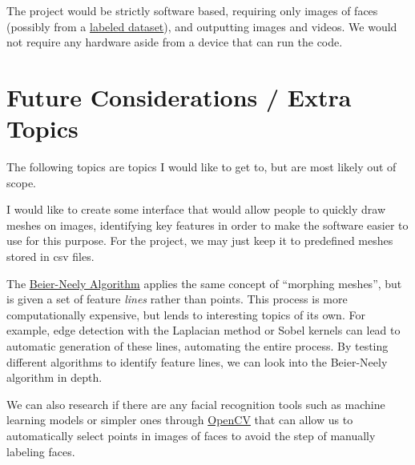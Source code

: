 \documentclass[a4paper]{article}
\begin{document}
The project would be strictly software based, requiring only images of faces (possibly from a \href{https://libguides.princeton.edu/facedatabases}{labeled dataset}), and outputting images and videos. We would not require any hardware aside from a device that can run the code.

\section*{Future Considerations / Extra Topics}

The following topics are topics I would like to get to, but are most likely out of scope.

I would like to create some interface that would allow people to quickly draw meshes on images, identifying key features in order to make the software easier to use for this purpose. For the project, we may just keep it to predefined meshes stored in csv files.

The \href{https://www.cs.princeton.edu/courses/archive/fall00/cs426/papers/beier92.pdf}{Beier-Neely Algorithm} applies the same concept of ``morphing meshes'', but is given a set of feature \textit{lines} rather than points. This process is more computationally expensive, but lends to interesting topics of its own. For example, edge detection with the Laplacian method or Sobel kernels can lead to automatic generation of these lines, automating the entire process. By testing different algorithms to identify feature lines, we can look into the Beier-Neely algorithm in depth.

We can also research if there are any facial recognition tools such as machine learning models or simpler ones through \href{https://docs.opencv.org/4.x/da/d60/tutorial_face_main.html}{OpenCV} that can allow us to automatically select points in images of faces to avoid the step of manually labeling faces.
\end{document}
